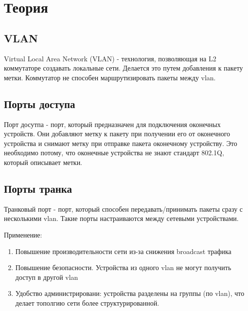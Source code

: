 \chapter{Теория}
\label{ch:chap1}

  
\section{VLAN}

Virtual Local Area Network (VLAN) - технология, позволяющая на L2 коммутаторе создавать локальные сети. Делается
это путем добавления к пакету метки. Коммутатор не способен маршрутизировать пакеты между vlan. 
\section{Порты доступа}

Порт досутпа - порт, который предназначен для подключения оконечных устройств. Они добавляют метку к пакету при получении его
от оконечного устройства и снимают метку при отправке пакета оконечному устройству. Это необходимо потому, что оконечные
устройства не знают стандарт 802.1Q, который описывает метки. 

\section{Порты транка}
Транковый порт - порт, который способен передавать/принимать пакеты сразу с несколькими vlan. Такие порты настраиваются
между сетевыми устройствами.


Применение:

\begin{enumerate}
    \item Повышение производительности сети из-за снижения broadcast трафика
    \item Повышение безопасности. Устройства из одного vlan не могут получить доступ в другой vlan
    \item Удобство администрировани: устройства разделены на группы (по vlan), что делает тополгию сети более структурированной.
\end{enumerate}


\endinput